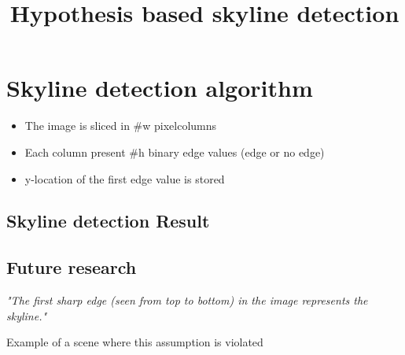 \section{Skyline detection algorithm}%
\begin{itemize}
	\item The image is sliced in #w pixelcolumns
	\item Each column present #h binary edge values (edge or no edge)
	\item y-location of the first edge value is stored 
\end{itemize}



\subsection{Skyline detection Result}%

\subsection{Future research}
\title{Hypothesis based skyline detection}
\emph{"The first sharp edge (seen from top to bottom) in the image represents the skyline."}
\item Example of a scene where this assumption is violated
\item 



